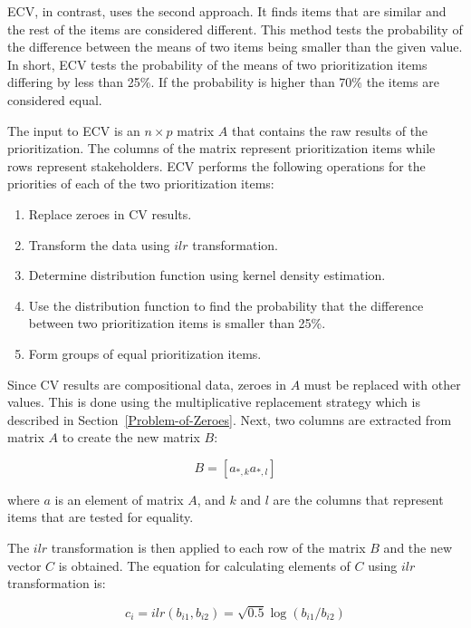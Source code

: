 ECV, in contrast, uses the second approach.
It finds items that are similar and the rest of the items are considered different.
This method tests the probability of the difference between the means of two items being smaller than the given value. In short, ECV tests the probability of the means of two prioritization items differing by less than 25\%.
If the probability is higher than 70\% the items are considered equal.

The input to ECV is an $n\times p$ matrix $A$ that contains the raw results of the prioritization.
The columns of the matrix represent prioritization items while rows represent stakeholders.
ECV performs the following operations for the priorities of each of the two prioritization items:

\begin{enumerate}
\item Replace zeroes in CV results.
\item Transform the data using $ilr$ transformation.
\item Determine distribution function using kernel density estimation.
\item Use the distribution function to find the probability that the difference between two prioritization items is smaller than 25\%.
\item Form groups of equal prioritization items.
\end{enumerate}

Since CV results are compositional data, zeroes in $A$ must be replaced with other values.
This is done using the multiplicative replacement strategy which is described in Section~\ref{Problem-of-Zeroes}.
Next, two columns are extracted from matrix $A$ to create the new matrix $B$:

\begin{equation}
	B=\left[a_{*,k}a_{*,l}\right]\label{eq:b}
\end{equation}
	
where $a$ is an element of matrix $A$, and $k$ and $l$ are the columns that represent items that are tested for equality.

The $ilr$ transformation is then applied to each row of the matrix $B$ and the new vector $C$ is obtained. The equation for calculating elements of $C$ using $ilr$ transformation is:

\begin{equation}
	c_{i}=ilr(b_{i1},b_{i2})=\sqrt{0.5}\log(b_{i1}/b_{i2})\label{eq:c}
\end{equation}

